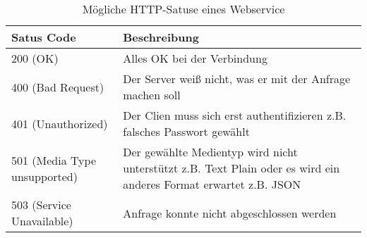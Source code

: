 \begin{table}
\begin{tabular}{l | p{9.50 cm}}
	Satus Code & Beschreibung \\
\hline
200 (OK) & Alles OK bei der Verbindung \\
400 (Bad Request) & Der Server weiß nicht, was er mit der Anfrage machen soll \\
401 (Unauthorized) & Der Clien muss sich erst authentifizieren z.B. falsches Passwort gewählt \\
501 (Media Type unsupported) & Der gewählte Medientyp wird nicht unterstützt z.B. Text Plain oder es wird ein anderes Format erwartet z.B. JSON\\
503 (Service Unavailable) & Anfrage konnte nicht abgeschlossen werden 
\end{tabular}
\caption{Mögliche HTTP-Satuse eines Webservice}
\label{tab:http_status}
\end{table}